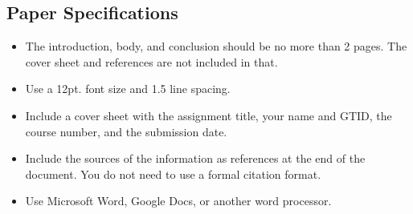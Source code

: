 \documentclass[12pt]{article}
\begin{document}
\subsection{Paper Specifications}

\begin{itemize}
    \item The introduction, body, and conclusion should be no more than 2 pages. The cover sheet and references are not included in that.
    \item Use a 12pt. font size and 1.5 line spacing.
    \item Include a cover sheet with the assignment title, your name and GTID, the course number, and the submission date.
    \item Include the sources of the information as references at the end of the document.  You do not need to use a formal citation format.
    \item Use Microsoft Word, Google Docs, or another word processor.
\end{itemize}
\end{document}
